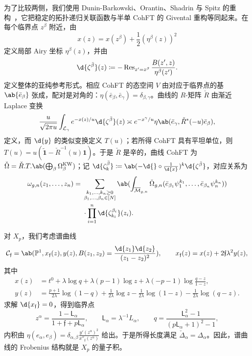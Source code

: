 \documentclass{amsart}
\theoremstyle{definition}
\theoremstyle{remark}
\theoremstyle{plain}
\theoremstyle{definition}
\theoremstyle{remark}
\renewcommand{\P}{\mathbb{P}}
\newcommand{\Mbar}{\overline{\mathcal{M}}}
\newcommand{\mc}[1]{\mathcal{#1}}
\newcommand{\mf}[1]{\mathfrak{#1}}
\newcommand{\mr}[1]{\mathrm{#1}}
\newcommand{\on}[1]{\operatorname{#1}}
\newcommand{\ms}[1]{\mathsf{#1}}
\newcommand{\wt}[1]{\widetilde{#1}}
\newcommand{\1}{\mathbf{1}}
\newcommand{\2}{\mathbf{2}}
\newcommand{\3}{\mathbf{3}}
\begin{document}
为了比较两侧，我们使用 Dunin-Barkowski、Orantin、Shadrin 与 Spitz 的重构~\cite{DOSS2014}，它把稳定的拓扑递归关联函数与半单 CohFT 的 Givental 重构等同起来。在每个临界点 \(z^{\beta}\) 附近，由
\[ x(z) = x(z^{\beta}) + \frac{1}{2}(\eta^{\beta}(z))^2 \]
定义局部 Airy 坐标 \(\eta^{\beta}(z)\)，并由
\[ \d{\zeta^{\bar{\beta}}}(z) \coloneqq -\on{Res}_{z'=z^{\beta}}\frac{B(z',z)}{\eta^{\beta}(z')}. \]
定义整体的亚纯参考形式。相应 CohFT 的态空间 \(V\) 由对应于临界点的基 \(\ab\{\bar{e}_{\beta}\}\) 张成，配对是对角的：\(\eta(\bar{e}_{\beta},\bar{e}_{\gamma}) = \delta_{\beta,\gamma}\)。曲线的 \(R\)-矩阵 \(\check{R}\) 由渐近 Laplace 变换
\[ \frac{u}{\sqrt{2\pi u}}\int_{\mc{L}_{\gamma}} e^{-x(z)/u}\d{\zeta^{\bar{\beta}}}(z) \asymp e^{-x^{\gamma}/u}\eta\ab(\bar{e}_{\gamma}, \check{R}^*(-u)\bar{e}_{\beta}), \]
定义，而 \(\d{y}\) 的类似变换定义 \(T(u)\)；若所得 CohFT 具有平坦单位，则 \(T(u) = u(\wt{\1}-\check{R}^{-1}(u)\1)\)。于是 \(\check{R}\) 是辛的，曲线 CohFT 为 \(\check{\Omega} = \check{R}.T.\ab(\bigoplus_{\beta}\Omega^{\mr{KW}}_{\beta})\)；记 \(\d{\zeta^{\bar{\beta}}_k} \coloneqq \ab(-\d{} \circ \frac{1}{\d{x}})^k \d{\zeta^{\bar{\beta}}}\)，对应关系为
\begin{align*}
    \omega_{g,n}(z_1,\ldots,z_n) ={}& \sum_{\substack{k_1,\ldots,k_n \geq 0 \\ \beta_1,\ldots,\beta_n \in [N]}}\ab(\int_{\Mbar_{g,n}} \check{\Omega}_{g,n}(\bar{e}_{\beta_1}\psi_1^{k_1},\ldots,\bar{e}_{\beta_n}\psi_n^{k_n})) \\
    &\cdot \prod_{i=1}^n \d{\zeta^{\beta_i}_{k_i}}(z_i).
\end{align*}

对 \(X_p\)，我们考虑谱曲线
\[ \mc{C}_{\mf{f}} = \ab(\P^1, x_{\mf{f}}(z), y(z), B(z_1,z_2) = \frac{\d{z_1}\d{z_2}}{(z_1-z_2)^2}), \qquad x_{\mf{f}}(z) = x(z) + 2\mf{f}\lambda^2 y(z), \]
其中
\begin{align*}
    x(z) &= t^0 + \lambda \log q + \lambda(p-1)\log z + \lambda(-p-1)\log\frac{q-z}{1-z}, \\
    y(z) &= \frac{p+1}{2\lambda}\log(1-q) + \frac{1}{2\lambda}\log z - \frac{1}{2\lambda}\log(1-z) - \frac{1}{2\lambda}\log(q-z).
\end{align*}
求解 \(\d{x_{\mf{f}}} = 0\)，得到临界点
\[ z^{\alpha} = \frac{1-\ms{L}_{\alpha}}{1+\mf{f}+p\ms{L}_{\alpha}}, \qquad \ms{L}_{\alpha} = \lambda^{-1}L_{\alpha}, \qquad q = \frac{\ms{L}_{\alpha}^2-1}{(p\ms{L}_{\alpha}+1)^2-1}, \]
内积由 \(\eta(e_{\alpha},e_{\beta}) = \delta_{\alpha,\beta}\frac{y'(z^{\alpha})^2}{x''_{\mf{f}}(z^{\alpha})}\) 给出。于是所得长度满足 \(\check{\Delta}_{\alpha} = \Delta_{\alpha}\)。因此，谱曲线的 Frobenius 结构就是 \(X_p\) 的量子积。
\end{document}

